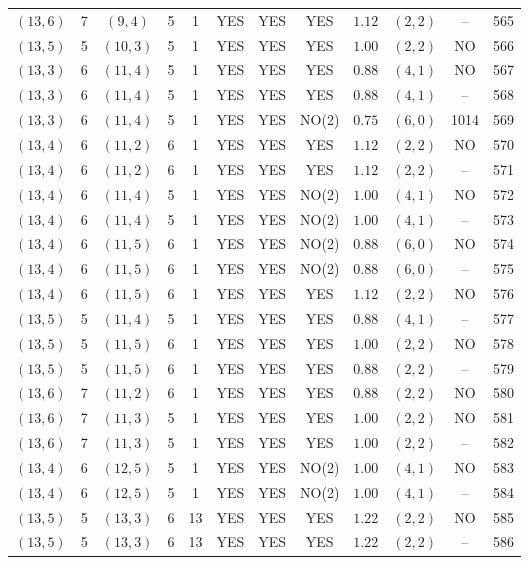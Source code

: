 \begin{longtable}{|c|c|c|c|c|c|c|c|c|c|c|c|}
$(13,6)$ & 7 & $(9,4)$ & 5 & 1 & YES & YES & YES & $1.12$ & $(2,2)$ & -- & 565\\
$(13,5)$ & 5 & $(10,3)$ & 5 & 1 & YES & YES & YES & $1.00$ & $(2,2)$ & NO & 566\\
$(13,3)$ & 6 & $(11,4)$ & 5 & 1 & YES & YES & YES & $0.88$ & $(4,1)$ & NO & 567\\
$(13,3)$ & 6 & $(11,4)$ & 5 & 1 & YES & YES & YES & $0.88$ & $(4,1)$ & -- & 568\\
$(13,3)$ & 6 & $(11,4)$ & 5 & 1 & YES & YES & NO(2) & $0.75$ & $(6,0)$ & 1014 & 569\\
$(13,4)$ & 6 & $(11,2)$ & 6 & 1 & YES & YES & YES & $1.12$ & $(2,2)$ & NO & 570\\
$(13,4)$ & 6 & $(11,2)$ & 6 & 1 & YES & YES & YES & $1.12$ & $(2,2)$ & -- & 571\\
$(13,4)$ & 6 & $(11,4)$ & 5 & 1 & YES & YES & NO(2) & $1.00$ & $(4,1)$ & NO & 572\\
$(13,4)$ & 6 & $(11,4)$ & 5 & 1 & YES & YES & NO(2) & $1.00$ & $(4,1)$ & -- & 573\\
$(13,4)$ & 6 & $(11,5)$ & 6 & 1 & YES & YES & NO(2) & $0.88$ & $(6,0)$ & NO & 574\\
$(13,4)$ & 6 & $(11,5)$ & 6 & 1 & YES & YES & NO(2) & $0.88$ & $(6,0)$ & -- & 575\\
$(13,4)$ & 6 & $(11,5)$ & 6 & 1 & YES & YES & YES & $1.12$ & $(2,2)$ & NO & 576\\
$(13,5)$ & 5 & $(11,4)$ & 5 & 1 & YES & YES & YES & $0.88$ & $(4,1)$ & -- & 577\\
$(13,5)$ & 5 & $(11,5)$ & 6 & 1 & YES & YES & YES & $1.00$ & $(2,2)$ & NO & 578\\
$(13,5)$ & 5 & $(11,5)$ & 6 & 1 & YES & YES & YES & $0.88$ & $(2,2)$ & -- & 579\\
$(13,6)$ & 7 & $(11,2)$ & 6 & 1 & YES & YES & YES & $0.88$ & $(2,2)$ & NO & 580\\
$(13,6)$ & 7 & $(11,3)$ & 5 & 1 & YES & YES & YES & $1.00$ & $(2,2)$ & NO & 581\\
$(13,6)$ & 7 & $(11,3)$ & 5 & 1 & YES & YES & YES & $1.00$ & $(2,2)$ & -- & 582\\
$(13,4)$ & 6 & $(12,5)$ & 5 & 1 & YES & YES & NO(2) & $1.00$ & $(4,1)$ & NO & 583\\
$(13,4)$ & 6 & $(12,5)$ & 5 & 1 & YES & YES & NO(2) & $1.00$ & $(4,1)$ & -- & 584\\
$(13,5)$ & 5 & $(13,3)$ & 6 & 13 & YES & YES & YES & $1.22$ & $(2,2)$ & NO & 585\\
$(13,5)$ & 5 & $(13,3)$ & 6 & 13 & YES & YES & YES & $1.22$ & $(2,2)$ & -- & 586\\

\end{longtable}
